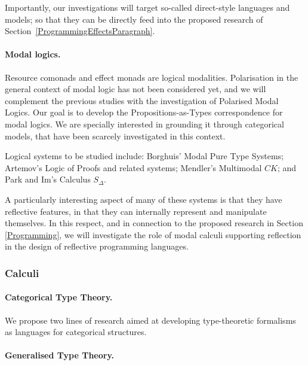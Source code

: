 \documentclass[11pt,twocolumn]{article}
\newcommand{\hl}[1]{#1}%
\begin{document}
Importantly, our investigations will target so-called direct-style languages
and models; so that they can be directly feed into the proposed research of
Section~\ref{ProgrammingEffectsParagraph}.

\paragraph{Modal logics.}
\label{ModalLogicsParagraph}

Resource comonads and effect monads are logical modalities.  Polarisation in
the general context of modal logic has not been considered yet, and we will
complement the previous studies 
with the \hl{investigation} of Polarised
Modal Logics.  Our \hl{goal} is to develop the Propositions-as-Types
correspondence for modal logics.  We are specially interested in grounding it
through categorical models, that have been scarcely investigated in this
context.

Logical systems to be studied include:
%
Borghuis' Modal Pure Type Systems; %
%
Artemov's Logic of Proofs %
and related systems;
%
Mendler's Multimodal $CK$; %
and
%
Park and Im's Calculus $S_\Delta$. %

A particularly interesting aspect of many of these systems is that they
have reflective features, in that they can internally represent and
manipulate themselves.  In this respect, and in connection to the proposed
research in Section\,\ref{Programming}, we will investigate the role of
modal calculi supporting reflection in the design of reflective
programming languages.

\subsubsection{Calculi}
\label{CalculiSubsection}

\paragraph*{Categorical Type Theory.}

We propose two lines of \hl{research} aimed at developing type-theoretic
formalisms as languages for categorical structures.

\paragraph{Generalised Type Theory.}
\label{GeneralisedTypeTheoryParagraph}
\end{document}
